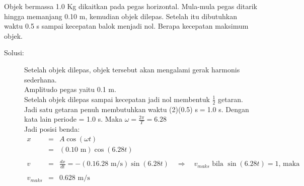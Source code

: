 \item
Objek bermassa 1.0 Kg dikaitkan pada pegas horizontal. Mula-mula pegas ditarik hingga memanjang 0.10 m, kemudian objek dilepas. Setelah itu dibutuhkan waktu 0.5 s sampai kecepatan balok menjadi nol. Berapa kecepatan maksimum objek.
\begin{description}
    \item[Solusi:]
Setelah objek dilepas, objek tersebut akan mengalami gerak harmonis sederhana.\\
Amplitudo pegas yaitu 0.1 m.\\
Setelah objek dilepas sampai kecepatan jadi nol membentuk $\frac{1}{2}$ getaran. Jadi satu getaran penuh membutuhkan waktu (2)(0.5) s$=$1.0 s. Dengan kata lain periode = 1.0 s. Maka $\omega=\frac{2\pi}{T}=6.28$\\

Jadi posisi benda:
\begin{eqnarray*}
x&=&A\cos(\omega t)\\
&=&(0.10 \mbox{ m})\cos(6.28 t) \\
\\
v&=&\frac{dx}{dt}=-(0.1 6.28 \mbox{ m/s}) \sin(6.28 t) \quad \Rightarrow\quad \textrm{$v_{maks}$ bila $\sin(6.28t)=1$, maka} \\
\\
v_{maks}&=&0.628 \mbox{ m/s}
\end{eqnarray*}
\\[1.5cm]

\end{description}
